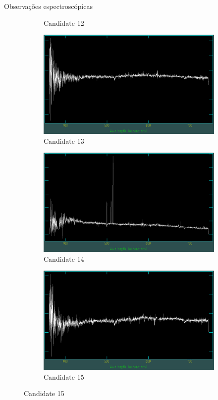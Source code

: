 \begin{frame}[c]{Observações espectroscópicas}
\begin{figure}
\begin{subfigure}[b]{0.31\textwidth}
        \caption{Candidate 12}
    \end{subfigure}
    \begin{subfigure}[b]{0.31\textwidth}
        \includegraphics[width=\textwidth]{images/espectros/UCG13.png}
        \caption{Candidate 13}
    \end{subfigure}
    \begin{subfigure}[b]{0.31\textwidth}
        \includegraphics[width=\textwidth]{images/espectros/UCG14.png}
        \caption{Candidate 14}
    \end{subfigure}
    \begin{subfigure}[b]{0.31\textwidth}
        \includegraphics[width=\textwidth]{images/espectros/UCG15.png}
        \caption{Candidate 15}
    \end{subfigure}
\end{figure}
\end{frame}


